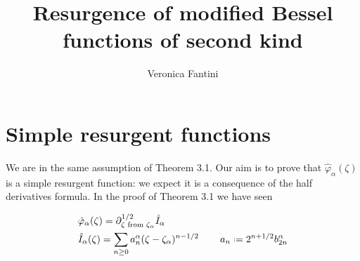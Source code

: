 \documentclass{article}
\title{Resurgence of modified Bessel functions of second kind}
\author{Veronica Fantini}
\begin{document}
\maketitle

\section{Simple resurgent functions}

We are in the same assumption of Theorem 3.1. Our aim is to prove that $\hat{\varphi}_{\alpha}(\zeta)$ is a simple resurgent function: we expect it is a consequence of the half derivatives formula. In the proof of Theorem 3.1 we have seen

\begin{align}
&\hat{\varphi}_{\alpha}(\zeta)=\partial_{\zeta \text{ from } \zeta_\alpha}^{1/2}\hat{I}_{\alpha} \\
&\hat{I}_{\alpha}(\zeta)=\sum_{n\geq 0}a_n^{\alpha}(\zeta-\zeta_{\alpha})^{n-1/2}\,\qquad a_n\defeq 2^{n+1/2}b_{2n}^{\alpha}
\end{align}
\end{document}
